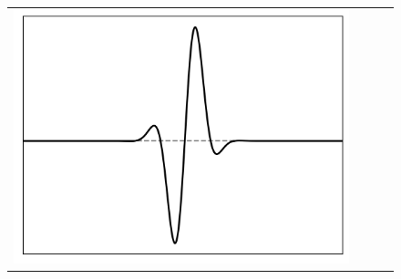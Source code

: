 \documentclass[10pt,final,xcolor=dvipsnames]{beamer}
\begin{document}
\begin{frame}
\begin{figure}
{\begin{tabular}{cccc}
	    \includegraphics[scale=0.2]{localpsf_revised_figures/frog_1d_a=20.0.png} & 

\end{tabular}}
\end{figure}
\end{frame}
\end{document}
